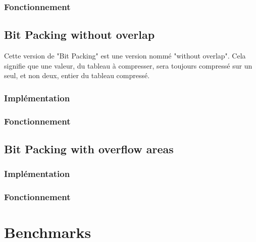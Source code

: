 \documentclass[titlepage]{article}
\begin{document}
\subsubsection{Fonctionnement}

\subsection{Bit Packing without overlap}

Cette version de "Bit Packing" est une version nommé "without overlap". Cela signifie que une valeur, du tableau à compresser, sera toujours compressé sur un seul, et non deux, entier du tableau compressé.

\subsubsection{Implémentation}

\subsubsection{Fonctionnement}

\subsection{Bit Packing with overflow areas}

\subsubsection{Implémentation}

\subsubsection{Fonctionnement}

\clearpage

\section{Benchmarks}
\end{document}
